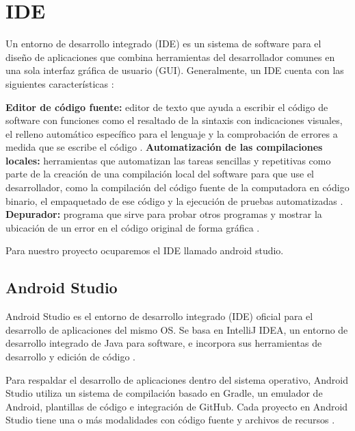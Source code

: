 
\section{IDE}

Un entorno de desarrollo integrado (IDE) es un sistema de software para el diseño de aplicaciones que combina herramientas del desarrollador comunes en una sola interfaz gráfica de usuario (GUI). Generalmente, un IDE cuenta con las siguientes características \cite{CitaD18}:

\begin{list}{}%
    {\setlength{\leftmargin}{1cm}%
     \setlength{\rightmargin}{1cm}%
     \setlength{\itemsep}{0.5\baselineskip}%
     \setlength{\parsep}{0pt}}
     
    \item\relax
    \small
    \textbf{Editor de código fuente:} editor de texto que ayuda a escribir el código de software con funciones como el resaltado de la sintaxis con indicaciones visuales, el relleno automático específico para el lenguaje y la comprobación de errores a medida que se escribe el código \cite{CitaD18}.
    \textbf{Automatización de las compilaciones locales:} herramientas que automatizan las tareas sencillas y repetitivas como parte de la creación de una compilación local del software para que use el desarrollador, como la compilación del código fuente de la computadora en código binario, el empaquetado de ese código y la ejecución de pruebas automatizadas \cite{CitaD18}.
    \textbf{Depurador:} programa que sirve para probar otros programas y mostrar la ubicación de un error en el código original de forma gráfica \cite{CitaD18}.

\end{list}

Para nuestro proyecto ocuparemos el IDE llamado android studio.

\subsection{Android Studio}

\begin{list}{}%
    {\setlength{\leftmargin}{1cm}\setlength{\rightmargin}{1cm}}
    \item\relax
    \small

Android Studio es el entorno de desarrollo integrado (IDE) oficial para el desarrollo de aplicaciones del mismo OS. Se basa en IntelliJ IDEA, un entorno de desarrollo integrado de Java para software, e incorpora sus herramientas de desarrollo y edición de código \cite{CitaD19}.

Para respaldar el desarrollo de aplicaciones dentro del sistema operativo, Android Studio utiliza un sistema de compilación basado en Gradle, un emulador de Android, plantillas de código e integración de GitHub. Cada proyecto en Android Studio tiene una o más modalidades con código fuente y archivos de recursos \cite{CitaD19}.

\end{list}


